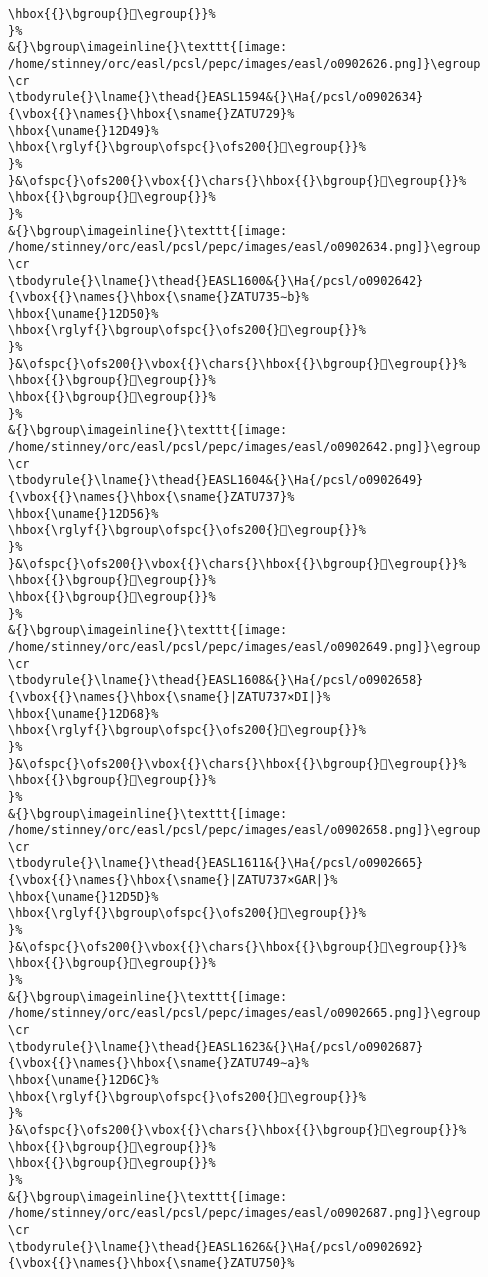 \begin{verbatim}
\hbox{{}\bgroup{}𒵃\egroup{}}%
}%
&{}\bgroup\imageinline{}\texttt{[image: /home/stinney/orc/easl/pcsl/pepc/images/easl/o0902626.png]}\egroup
\cr
\tbodyrule{}\lname{}\thead{}EASL1594&{}\Ha{/pcsl/o0902634}{\vbox{{}\names{}\hbox{\sname{}ZATU729}%
\hbox{\uname{}12D49}%
\hbox{\rglyf{}\bgroup\ofspc{}\ofs200{}𒵉\egroup{}}%
}%
}&\ofspc{}\ofs200{}\vbox{{}\chars{}\hbox{{}\bgroup{}𒵉\egroup{}}%
\hbox{{}\bgroup{}𒵊\egroup{}}%
}%
&{}\bgroup\imageinline{}\texttt{[image: /home/stinney/orc/easl/pcsl/pepc/images/easl/o0902634.png]}\egroup
\cr
\tbodyrule{}\lname{}\thead{}EASL1600&{}\Ha{/pcsl/o0902642}{\vbox{{}\names{}\hbox{\sname{}ZATU735∼b}%
\hbox{\uname{}12D50}%
\hbox{\rglyf{}\bgroup\ofspc{}\ofs200{}𒵐\egroup{}}%
}%
}&\ofspc{}\ofs200{}\vbox{{}\chars{}\hbox{{}\bgroup{}𒵒\egroup{}}%
\hbox{{}\bgroup{}𒵐\egroup{}}%
\hbox{{}\bgroup{}𒵑\egroup{}}%
}%
&{}\bgroup\imageinline{}\texttt{[image: /home/stinney/orc/easl/pcsl/pepc/images/easl/o0902642.png]}\egroup
\cr
\tbodyrule{}\lname{}\thead{}EASL1604&{}\Ha{/pcsl/o0902649}{\vbox{{}\names{}\hbox{\sname{}ZATU737}%
\hbox{\uname{}12D56}%
\hbox{\rglyf{}\bgroup\ofspc{}\ofs200{}𒵖\egroup{}}%
}%
}&\ofspc{}\ofs200{}\vbox{{}\chars{}\hbox{{}\bgroup{}𒵖\egroup{}}%
\hbox{{}\bgroup{}𒵤\egroup{}}%
\hbox{{}\bgroup{}𒵧\egroup{}}%
}%
&{}\bgroup\imageinline{}\texttt{[image: /home/stinney/orc/easl/pcsl/pepc/images/easl/o0902649.png]}\egroup
\cr
\tbodyrule{}\lname{}\thead{}EASL1608&{}\Ha{/pcsl/o0902658}{\vbox{{}\names{}\hbox{\sname{}|ZATU737×DI|}%
\hbox{\uname{}12D68}%
\hbox{\rglyf{}\bgroup\ofspc{}\ofs200{}𒵨\egroup{}}%
}%
}&\ofspc{}\ofs200{}\vbox{{}\chars{}\hbox{{}\bgroup{}𒵚\egroup{}}%
\hbox{{}\bgroup{}𒵨\egroup{}}%
}%
&{}\bgroup\imageinline{}\texttt{[image: /home/stinney/orc/easl/pcsl/pepc/images/easl/o0902658.png]}\egroup
\cr
\tbodyrule{}\lname{}\thead{}EASL1611&{}\Ha{/pcsl/o0902665}{\vbox{{}\names{}\hbox{\sname{}|ZATU737×GAR|}%
\hbox{\uname{}12D5D}%
\hbox{\rglyf{}\bgroup\ofspc{}\ofs200{}𒵝\egroup{}}%
}%
}&\ofspc{}\ofs200{}\vbox{{}\chars{}\hbox{{}\bgroup{}𒵝\egroup{}}%
\hbox{{}\bgroup{}𒵦\egroup{}}%
}%
&{}\bgroup\imageinline{}\texttt{[image: /home/stinney/orc/easl/pcsl/pepc/images/easl/o0902665.png]}\egroup
\cr
\tbodyrule{}\lname{}\thead{}EASL1623&{}\Ha{/pcsl/o0902687}{\vbox{{}\names{}\hbox{\sname{}ZATU749∼a}%
\hbox{\uname{}12D6C}%
\hbox{\rglyf{}\bgroup\ofspc{}\ofs200{}𒵬\egroup{}}%
}%
}&\ofspc{}\ofs200{}\vbox{{}\chars{}\hbox{{}\bgroup{}𒵬\egroup{}}%
\hbox{{}\bgroup{}𒵭\egroup{}}%
\hbox{{}\bgroup{}𒵮\egroup{}}%
}%
&{}\bgroup\imageinline{}\texttt{[image: /home/stinney/orc/easl/pcsl/pepc/images/easl/o0902687.png]}\egroup
\cr
\tbodyrule{}\lname{}\thead{}EASL1626&{}\Ha{/pcsl/o0902692}{\vbox{{}\names{}\hbox{\sname{}ZATU750}%

\end{verbatim}
